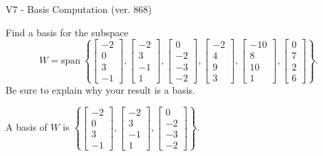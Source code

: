 \begin{exercise}
  \begin{exerciseTitle}V7 - Basis Computation (ver. 868)\end{exerciseTitle}
  \begin{exerciseStatement}
    Find a basis for the subspace 
\[W=\mathrm{span}\ \left\{\left[\begin{array}{r}
-2 \\
0 \\
3 \\
-1
\end{array}\right] , \left[\begin{array}{r}
-2 \\
3 \\
-1 \\
1
\end{array}\right] , \left[\begin{array}{r}
0 \\
-2 \\
-3 \\
-2
\end{array}\right] , \left[\begin{array}{r}
-2 \\
4 \\
9 \\
3
\end{array}\right] , \left[\begin{array}{r}
-10 \\
8 \\
10 \\
1
\end{array}\right] , \left[\begin{array}{r}
0 \\
7 \\
2 \\
6
\end{array}\right]\right\}.\]
 Be sure to explain why your result is a basis.


  \end{exerciseStatement}
  \begin{exerciseAnswer}
   A basis of \(W\) is  \(\left\{\left[\begin{array}{r}
-2 \\
0 \\
3 \\
-1
\end{array}\right] , \left[\begin{array}{r}
-2 \\
3 \\
-1 \\
1
\end{array}\right] , \left[\begin{array}{r}
0 \\
-2 \\
-3 \\
-2
\end{array}\right]\right\}\).
  


  \end{exerciseAnswer}
\end{exercise}